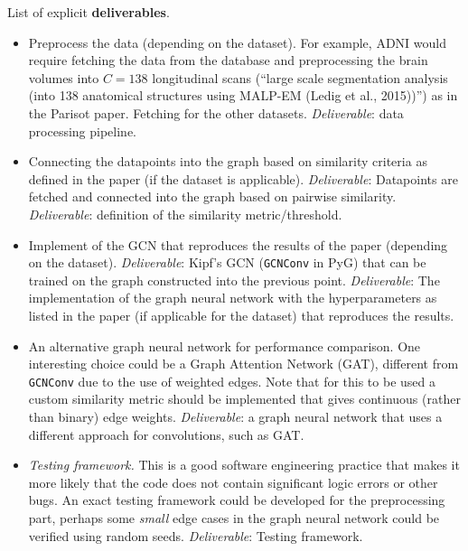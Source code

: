 \documentclass[12pt,a4paper,twoside]{article}
\begin{document}
List of explicit \textbf{deliverables}.
\begin{itemize}
  \item Preprocess the data (depending on the dataset). For example, ADNI would require fetching the data from the database and preprocessing the brain volumes into $C=138$ longitudinal scans (“large scale segmentation analysis (into 138 anatomical structures using MALP-EM (Ledig et al., 2015))”) as in the Parisot paper. Fetching for the other datasets. \textit{Deliverable}: data processing pipeline. %
  \item Connecting the datapoints into the graph based on similarity criteria as defined in the paper (if the dataset is applicable). \textit{Deliverable}: Datapoints are fetched and connected into the graph based on pairwise similarity. \textit{Deliverable}: definition of the similarity metric/threshold. %
  \item Implement of the GCN that reproduces the results of the paper (depending on the dataset). \textit{Deliverable}: Kipf's GCN (\texttt{GCNConv} in PyG) that can be trained on the graph constructed into the previous point. \textit{Deliverable}: The implementation of the graph neural network with the hyperparameters as listed in the paper (if applicable for the dataset) that reproduces the results.
  \item An alternative graph neural network for performance comparison. One interesting choice could be a Graph Attention Network (GAT), different from \texttt{GCNConv} due to the use of weighted edges. Note that for this to be used a custom similarity metric should be implemented that gives continuous (rather than binary) edge weights. \textit{Deliverable}: a graph neural network that uses a different approach for convolutions, such as GAT.
  \item \textit{Testing framework.} This is a good software engineering practice that makes it more likely that the code does not contain significant logic errors or other bugs. An exact testing framework could be developed for the preprocessing part, perhaps some \textit{small} edge cases in the graph neural network could be verified using random seeds. \textit{Deliverable}: Testing framework.

\end{itemize}
\end{document}
